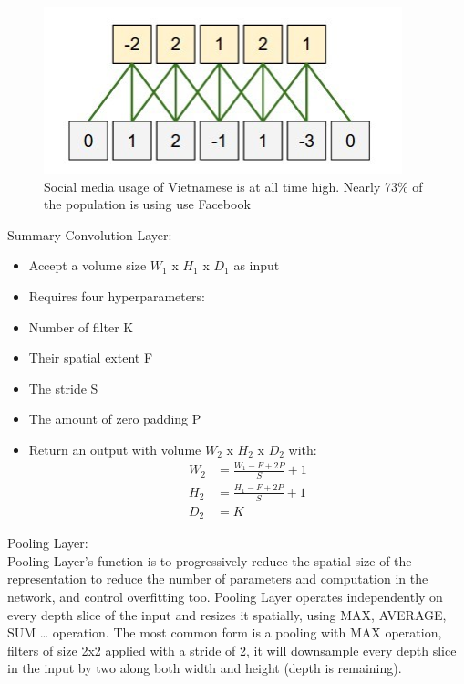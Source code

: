 \begin{center}
  \begin{figure}[H]
  \centering
  \includegraphics[width=1\columnwidth]{images/chap2/Output_volume_WSP.png}
  \caption{Social media usage of Vietnamese is at all time high. Nearly 73\% of the population is using use Facebook}
  \label{chap2:WSP}
  \end{figure}
\end{center}
Summary Convolution Layer:
\begin{itemize}
	\item Accept a volume size $W_{1}$ x $H_{1}$ x $D_{1}$ as input
	\item Requires four hyperparameters:
	\item Number of filter K
	\item Their spatial extent F 
	\item The stride S
	\item The amount of zero padding P
	\item Return an output with volume $W_{2}$ x $H_{2}$ x $D_{2}$ with:
	\begin{align*}
		W_{2} &= \frac{W_{1} - F + 2P }{S} + 1 \\
		H_{2} &= \frac{H_{1} - F + 2P }{S} + 1 \\
		D_{2} &= K
	\end{align*}
\end{itemize}
Pooling Layer:\\
Pooling Layer's function is to progressively reduce the spatial size of the representation to reduce the number of parameters and computation in the network, and control overfitting too. Pooling Layer operates independently on every depth slice of the input and resizes it spatially, using MAX, AVERAGE, SUM … operation. The most common form is a pooling with MAX operation, filters of size 2x2 applied with a stride of 2, it will downsample every depth slice in the input by two along both width and height (depth is remaining).\\
